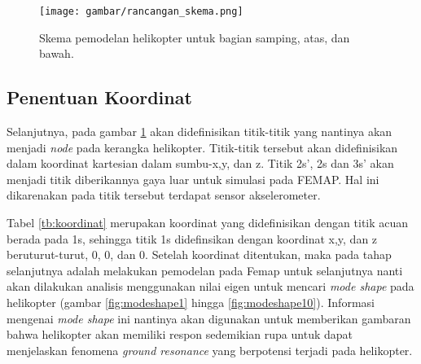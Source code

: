 \begin{figure}[H]
	\centering
	\texttt{[image: gambar/rancangan\_skema.png]}
	\caption{Skema pemodelan helikopter untuk bagian samping, atas, dan bawah.}
	\label{fig:skema_model}
\end{figure}

\subsection{Penentuan Koordinat}

Selanjutnya, pada gambar \ref{fig:skema_model} akan didefinisikan titik-titik yang nantinya akan menjadi \textit{node} pada kerangka helikopter. Titik-titik tersebut akan didefinisikan dalam koordinat kartesian dalam sumbu-x,y, dan z. Titik 2s', 2s dan 3s' akan menjadi titik diberikannya gaya luar untuk simulasi pada FEMAP. Hal ini dikarenakan pada titik tersebut terdapat sensor akselerometer.

Tabel \ref{tb:koordinat} merupakan koordinat yang didefinisikan dengan titik acuan berada pada 1s, sehingga titik 1s didefinsikan dengan koordinat x,y, dan z beruturut-turut, 0, 0, dan 0. Setelah koordinat ditentukan, maka pada tahap selanjutnya adalah melakukan pemodelan pada Femap untuk selanjutnya nanti akan dilakukan analisis menggunakan nilai eigen untuk mencari \textit{mode shape} pada helikopter (gambar \ref{fig:modeshape1} hingga \ref{fig:modeshape10}). Informasi mengenai \textit{mode shape} ini nantinya akan digunakan untuk memberikan gambaran bahwa helikopter akan memiliki respon sedemikian rupa untuk dapat menjelaskan fenomena \textit{ground resonance} yang berpotensi terjadi pada helikopter.

